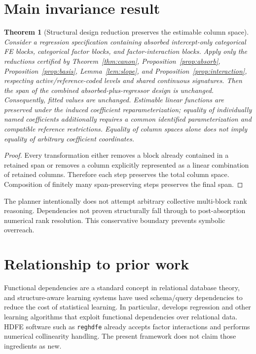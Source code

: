 \documentclass[11pt]{article}
\newtheorem{theorem}{Theorem}[section]
\theoremstyle{definition}
\newcommand{\1}{\mathbf{1}}
\begin{document}
\section{Main invariance result}

\begin{theorem}[Structural design reduction preserves the estimable column space]\label{thm:main}
Consider a regression specification containing absorbed intercept-only categorical FE blocks, categorical factor blocks, and factor-interaction blocks. Apply only the reductions certified by Theorem~\ref{thm:canon}, Proposition~\ref{prop:absorb}, Proposition~\ref{prop:basis}, Lemma~\ref{lem:slope}, and Proposition~\ref{prop:interaction}, respecting active/reference-coded levels and shared continuous signatures. Then the span of the combined absorbed-plus-regressor design is unchanged. Consequently, fitted values are unchanged. Estimable linear functions are preserved under the induced coefficient reparameterization; equality of individually named coefficients additionally requires a common identified parameterization and compatible reference restrictions. Equality of column spaces alone does not imply equality of arbitrary coefficient coordinates.
\end{theorem}
\begin{proof}
Every transformation either removes a block already contained in a retained span or removes a column explicitly represented as a linear combination of retained columns. Therefore each step preserves the total column space. Composition of finitely many span-preserving steps preserves the final span.
\end{proof}

The planner intentionally does not attempt arbitrary collective multi-block rank reasoning. Dependencies not proven structurally fall through to post-absorption numerical rank resolution. This conservative boundary prevents symbolic overreach.

\section{Relationship to prior work}

Functional dependencies are a standard concept in relational database theory, and structure-aware learning systems have used schema/query dependencies to reduce the cost of statistical learning. In particular, \citet{AboKhamis2017} develops regression and other learning algorithms that exploit functional dependencies over relational data. HDFE software such as \texttt{reghdfe} already accepts factor interactions and performs numerical collinearity handling. The present framework does not claim those ingredients as new.
\end{document}
